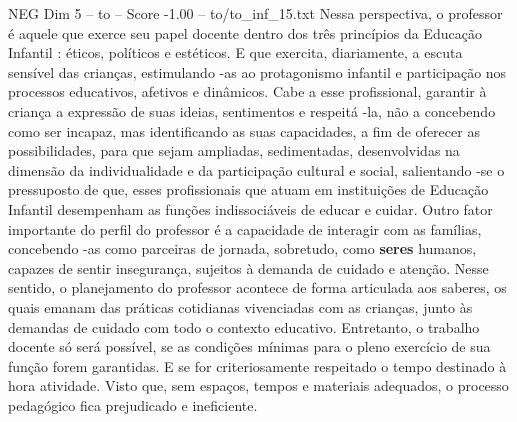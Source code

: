 \begin{textsample}{NEG Dim 5 – to – Score -1.00 – to/to\_inf\_15.txt}
Nessa perspectiva, o professor é aquele que exerce seu papel docente dentro dos três princípios da Educação Infantil : éticos, políticos e estéticos.
E que exercita, diariamente, a escuta sensível das crianças, estimulando -as ao protagonismo infantil e participação nos processos educativos, afetivos e dinâmicos.
Cabe a esse profissional, garantir à criança a expressão de suas ideias, sentimentos e respeitá -la, não a concebendo como ser incapaz, mas identificando as suas capacidades, a fim de oferecer as possibilidades, para que sejam ampliadas, sedimentadas, desenvolvidas na dimensão da individualidade e da participação cultural e social, salientando -se o pressuposto de que, esses profissionais que atuam em instituições de Educação Infantil desempenham as funções indissociáveis de educar e cuidar.
Outro fator importante do perfil do professor é a capacidade de interagir com as famílias, concebendo -as como parceiras de jornada, sobretudo, como \textbf{seres} humanos, capazes de sentir insegurança, sujeitos à demanda de cuidado e atenção.
Nesse sentido, o planejamento do professor acontece de forma articulada aos saberes, os quais emanam das práticas cotidianas vivenciadas com as crianças, junto às demandas de cuidado com todo o contexto educativo.
Entretanto, o trabalho docente só será possível, se as condições mínimas para o pleno exercício de sua função forem garantidas.
E se for criteriosamente respeitado o tempo destinado à hora atividade.
Visto que, sem espaços, tempos e materiais adequados, o processo pedagógico fica prejudicado e ineficiente.

\end{textsample}
